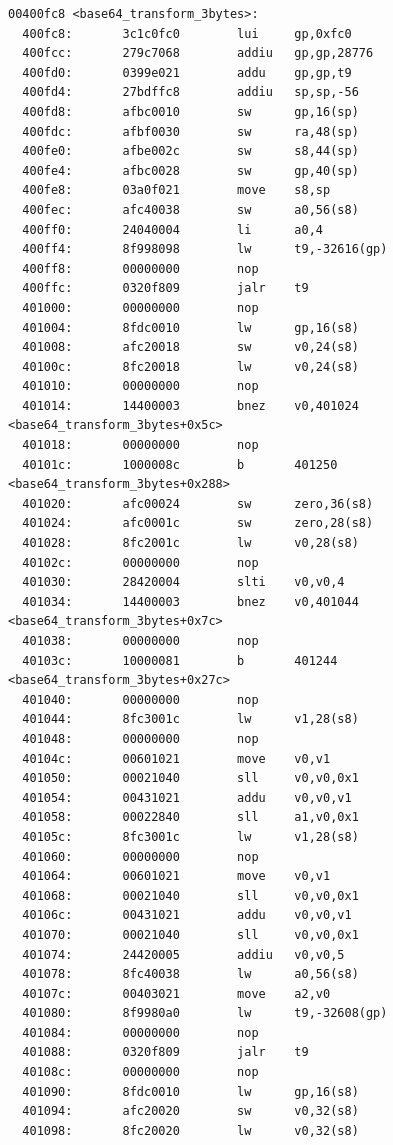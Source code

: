 \documentclass[11pt]{article}
\begin{document}
\begin{verbatim}
00400fc8 <base64_transform_3bytes>:
  400fc8:       3c1c0fc0        lui     gp,0xfc0
  400fcc:       279c7068        addiu   gp,gp,28776
  400fd0:       0399e021        addu    gp,gp,t9
  400fd4:       27bdffc8        addiu   sp,sp,-56
  400fd8:       afbc0010        sw      gp,16(sp)
  400fdc:       afbf0030        sw      ra,48(sp)
  400fe0:       afbe002c        sw      s8,44(sp)
  400fe4:       afbc0028        sw      gp,40(sp)
  400fe8:       03a0f021        move    s8,sp
  400fec:       afc40038        sw      a0,56(s8)
  400ff0:       24040004        li      a0,4
  400ff4:       8f998098        lw      t9,-32616(gp)
  400ff8:       00000000        nop
  400ffc:       0320f809        jalr    t9
  401000:       00000000        nop
  401004:       8fdc0010        lw      gp,16(s8)
  401008:       afc20018        sw      v0,24(s8)
  40100c:       8fc20018        lw      v0,24(s8)
  401010:       00000000        nop
  401014:       14400003        bnez    v0,401024 <base64_transform_3bytes+0x5c>
  401018:       00000000        nop
  40101c:       1000008c        b       401250 <base64_transform_3bytes+0x288>
  401020:       afc00024        sw      zero,36(s8)
  401024:       afc0001c        sw      zero,28(s8)
  401028:       8fc2001c        lw      v0,28(s8)
  40102c:       00000000        nop
  401030:       28420004        slti    v0,v0,4
  401034:       14400003        bnez    v0,401044 <base64_transform_3bytes+0x7c>
  401038:       00000000        nop
  40103c:       10000081        b       401244 <base64_transform_3bytes+0x27c>
  401040:       00000000        nop
  401044:       8fc3001c        lw      v1,28(s8)
  401048:       00000000        nop
  40104c:       00601021        move    v0,v1
  401050:       00021040        sll     v0,v0,0x1
  401054:       00431021        addu    v0,v0,v1
  401058:       00022840        sll     a1,v0,0x1
  40105c:       8fc3001c        lw      v1,28(s8)
  401060:       00000000        nop
  401064:       00601021        move    v0,v1
  401068:       00021040        sll     v0,v0,0x1
  40106c:       00431021        addu    v0,v0,v1
  401070:       00021040        sll     v0,v0,0x1
  401074:       24420005        addiu   v0,v0,5
  401078:       8fc40038        lw      a0,56(s8)
  40107c:       00403021        move    a2,v0
  401080:       8f9980a0        lw      t9,-32608(gp)
  401084:       00000000        nop
  401088:       0320f809        jalr    t9
  40108c:       00000000        nop
  401090:       8fdc0010        lw      gp,16(s8)
  401094:       afc20020        sw      v0,32(s8)
  401098:       8fc20020        lw      v0,32(s8)

\end{verbatim}
\end{document}
